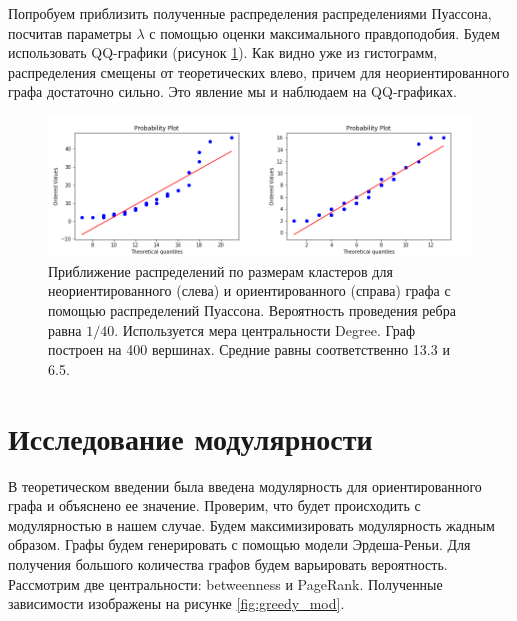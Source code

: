 Попробуем приблизить полученные распределения распределениями Пуассона, посчитав параметры $\lambda$ с помощью оценки максимального правдоподобия. Будем использовать QQ-графики (рисунок \ref{fig:qqs}). Как видно уже из гистограмм, распределения смещены от теоретических влево, причем для неориентированного графа достаточно сильно. Это явление мы и наблюдаем на QQ-графиках.

\begin{figure}[h!]
	\centering
	\includegraphics[width=\textwidth]{pics/qqs.png}
	\caption{Приближение распределений по размерам кластеров для неориентированного (слева) и ориентированного (справа) графа с помощью распределений Пуассона. Вероятность проведения ребра равна $1/40$. Используется мера центральности Degree. Граф построен на 400 вершинах. Средние равны соответственно 13.3 и 6.5.} 
	\label{fig:qqs}
\end{figure}

\section{Исследование модулярности}
В теоретическом введении была введена модулярность для ориентированного графа и объяснено ее значение. Проверим, что будет происходить с модулярностью в нашем случае. Будем максимизировать модулярность жадным образом. Графы будем генерировать с помощью модели Эрдеша-Реньи. Для получения большого количества графов будем варьировать вероятность. Рассмотрим две центральности: betweenness и PageRank. Полученные зависимости изображены на рисунке \ref{fig:greedy_mod}. \\

